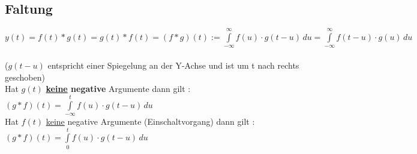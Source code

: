 %

	
	\subsection{Faltung }
	$y(t) = f(t)\ast g(t) = g(t) \ast f(t) = \boxed{ (f \ast g)(t) :=
	\int\limits_{-\infty}^\infty f(u) \cdot g(t-u) \, du} =
	\int\limits_{-\infty}^\infty f(t-u) \cdot g(u)\,du $ \\
	\\
	($g(t-u)$ entspricht einer Spiegelung an der Y-Achse und ist um t nach rechts geschoben)\\
	
	Hat $g\left(t\right)$ \textbf{\underline{keine} negative} Argumente dann gilt :
	$\left(g \ast f \right)\left(t\right)=\int\limits_{-\infty}^t f(u) \cdot
	g(t-u)\,du$\\
	Hat $f\left(t\right)$ \underline{keine} negative Argumente (Einschaltvorgang) dann gilt :
	$\left(g \ast f \right)\left(t\right)=\int\limits_{0}^t f(u) \cdot
	g(t-u)\,du$\\
	
